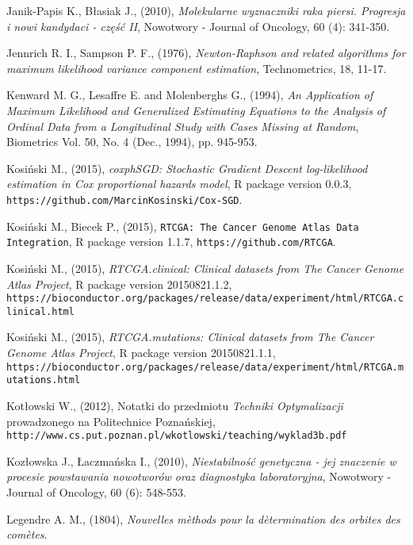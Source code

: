 \begin{thebibliography}{99}
 Janik-Papis K., Błasiak J., (2010), \textit{Molekularne wyznaczniki raka piersi. Progresja i nowi kandydaci - część II}, Nowotwory - Journal of Oncology, 60 (4): 341-350.

 Jennrich R. I., Sampson P. F., (1976), \textit{Newton-Raphson and related algorithms for maximum likelihood variance component estimation}, Technometrics, 18, 11-17.


 Kenward M. G., Lesaffre E. and Molenberghs G., (1994), \textit{An Application of Maximum Likelihood and Generalized Estimating Equations to the Analysis of Ordinal Data from a Longitudinal Study with Cases Missing at Random}, Biometrics
Vol. 50, No. 4 (Dec., 1994), pp. 945-953.


 Kosiński M., (2015), \textit{coxphSGD: Stochastic Gradient Descent log-likelihood estimation in Cox proportional hazards model}, R package version 0.0.3,  \texttt{https://github.com/MarcinKosinski/Cox-SGD}.

 Kosiński M., Biecek P., (2015), \texttt{RTCGA: The Cancer Genome Atlas Data Integration}, R package version 1.1.7, \texttt{https://github.com/RTCGA}.

 Kosiński M., (2015), \textit{RTCGA.clinical: Clinical datasets from The Cancer Genome Atlas Project}, R package version 20150821.1.2, \\ \texttt{https://bioconductor.org/packages/release/data/experiment/html/RTCGA.clinical.html}

 Kosiński M., (2015), \textit{RTCGA.mutations: Clinical datasets from The Cancer Genome Atlas Project}, R package version 20150821.1.1, \\ \texttt{https://bioconductor.org/packages/release/data/experiment/html/RTCGA.mutations.html}

 Kotłowski W., (2012), Notatki do przedmiotu \textit{Techniki Optymalizacji} prowadzonego na Politechnice Poznańskiej, \\ \texttt{http://www.cs.put.poznan.pl/wkotlowski/teaching/wyklad3b.pdf}

 Kozłowska J., Łaczmańska I., (2010), \textit{Niestabilność genetyczna - jej znaczenie w procesie powstawania nowotworów oraz diagnostyka laboratoryjna}, Nowotwory - Journal of Oncology, 60 (6): 548-553.

 Legendre A. M., (1804), \textit{Nouvelles m\`ethods pour la d\`etermination des orbites des com\`etes}.



\end{thebibliography}
